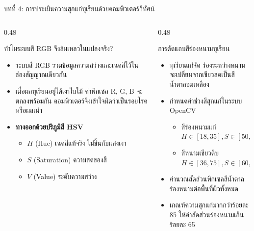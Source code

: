 \documentclass[aspectratio=169, 10pt]{beamer}
\begin{document}
\begin{frame}{บทที่ 4: การประเมินความสุกแก่ทุเรียนด้วยคอมพิวเตอร์วิทัศน์}
\begin{columns}[T]
    \begin{column}{0.48\textwidth}
        \begin{mastercard}{ทำไมระบบสี RGB จึงล้มเหลวในแปลงจริง?}
            \begin{itemize}
                \item ระบบสี RGB รวมข้อมูลความสว่างและเฉดสีไว้ในช่องสัญญาณเดียวกัน
                \item เมื่อผลทุเรียนอยู่ใต้เงาใบไม้ ค่าพิกเซล R, G, B จะตกลงพร้อมกัน คอมพิวเตอร์จึงเข้าใจผิดว่าเป็นรอยโรคหรือผลเน่า
                \item \textbf{ทางออกด้วยปริภูมิสี HSV}
                \begin{itemize}
                    \item $H$ (Hue) เฉดสีแท้จริง ไม่ขึ้นกับแสงเงา
                    \item $S$ (Saturation) ความสดของสี
                    \item $V$ (Value) ระดับความสว่าง
                \end{itemize}
            \end{itemize}
        \end{mastercard}
    \end{column}
    \begin{column}{0.48\textwidth}
        \begin{goldcard}{การตัดแถบสีร่องหนามทุเรียน}
            \begin{itemize}
                \item ทุเรียนแก่จัด ร่องระหว่างหนามจะเปลี่ยนจากเขียวสดเป็นสีน้ำตาลอมเหลือง
                \item กำหนดค่าช่วงสีสุกแก่ในระบบ OpenCV
                \begin{itemize}
                    \item สีร่องหนามแก่ $H \in [18, 35], S \in [50, 255]$
                    \item สีหนามเขียวดิบ $H \in [36, 75], S \in [60, 255]$
                \end{itemize}
                \item คำนวณสัดส่วนพิกเซลสีน้ำตาลร่องหนามต่อพื้นที่ผิวทั้งหมด
                \item เกณฑ์ความสุกแก่มากกว่าร้อยละ 85 ให้ค่าสัดส่วนร่องหนามเกินร้อยละ 65
            \end{itemize}
        \end{goldcard}
    \end{column}
\end{columns}
\end{frame}
\end{document}
